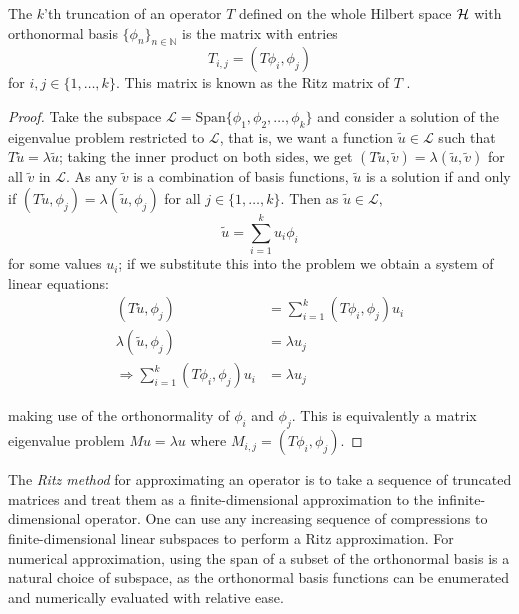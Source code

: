 \documentclass[../main.tex]{subfiles}
\begin{document}
\begin{proposition}
\label{thm:ritz-method}
  The $k$'th truncation of an operator $T$ defined on the whole Hilbert space
  $\mathcal{H}$ with orthonormal basis $\{\phi_n\}_{n \in \mathbb{N}}$ 
  is the matrix with entries
    $$T_{i,j} = (T\phi_i, \phi_j)$$
  for $i, j \in \{1, \hdots, k\}$.
  This matrix is known as the Ritz matrix of $T$ \cite{davies2003spectral}.
\end{proposition}
\begin{proof}
Take the subspace $\mathcal{L} = \text{Span}\{\phi_1, \phi_2, \hdots, \phi_k\}$ and
consider a solution
of the eigenvalue problem restricted to $\mathcal{L}$, that is, we want a function
$\tilde{u} \in \mathcal{L}$ such that $T\tilde{u} = \lambda\tilde{u}$; taking the inner
product on both sides, we get 
$(T\tilde{u}, \tilde{v}) = \lambda (\tilde{u}, \tilde{v})$ for all $\tilde{v}$
in $\mathcal{L}$. As any $\tilde{v}$ is a combination of basis functions, $\tilde{u}$
is a solution if and only if
$(T\tilde{u}, \phi_j) = \lambda (\tilde{u}, \phi_j)$ for all $j \in
\{1, \hdots, k\}$. Then as $\tilde{u} \in \mathcal{L},$ 
$$\tilde{u} = \sum_{i=1}^k u_i \phi_i$$
for some values $u_i$; if we substitute this into the problem we obtain a system
of linear equations:
\begin{align*}
  (T\tilde{u}, \phi_j) & = \sum_{i=1}^k (T\phi_i, \phi_j) u_i \\
  \lambda (\tilde{u}, \phi_j) & = \lambda u_j \\
  \Rightarrow \sum_{i=1}^k (T\phi_i, \phi_j) u_i & = \lambda u_j
\end{align*}

making use of the orthonormality of $\phi_i$ and $\phi_j$. This is equivalently
a matrix eigenvalue problem $M u = \lambda u$ where $M_{i,j} = (T\phi_i, \phi_j)$.
\end{proof}

The \emph{Ritz method} for approximating an operator is to take a sequence of truncated
matrices and treat them as a finite-dimensional approximation to the infinite-dimensional
operator.
One can use any increasing sequence of compressions to finite-dimensional linear subspaces
to perform a Ritz approximation. For numerical approximation, using the span of
a subset of the orthonormal basis is a natural choice of subspace, as the
orthonormal basis functions can be enumerated and numerically evaluated with relative ease.
\end{document}
